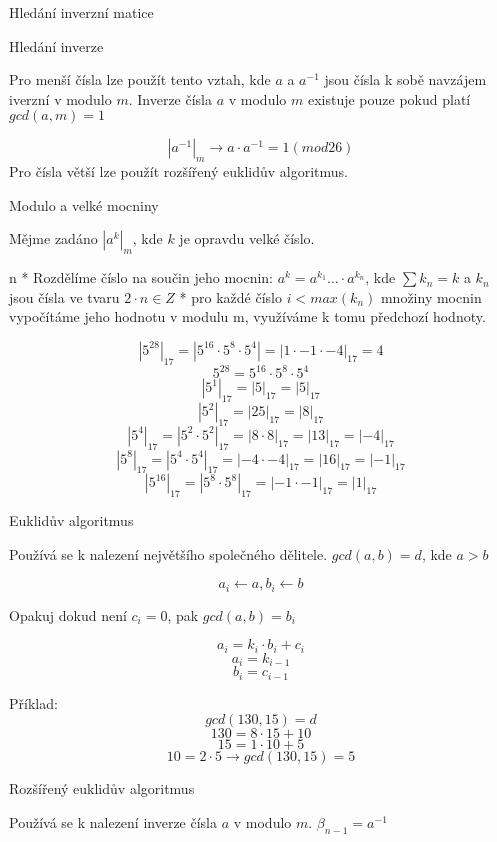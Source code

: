 \sec Hledání inverzní matice

\sec Hledání inverze

Pro menší čísla lze použít tento vztah, kde $a$ a $a^{-1}$ jsou čísla k sobě navzájem iverzní v modulo $m$.
Inverze čísla $a$ v modulo $m$ existuje pouze pokud platí $gcd(a,m) = 1$

$$
|a^{-1}|_{m} \rightarrow a \cdot a^{-1} = 1 (mod 26)
$$
\noindent
Pro čísla větší lze použít rozšířený euklidův algoritmus.

\sec Modulo a velké mocniny

Mějme zadáno $\left|a^k\right|_m$, kde $k$ je opravdu velké číslo.

\begitems \style n
* Rozdělíme číslo na součin jeho mocnin: $a^k=a^{k_1} \ldots \cdot a^{k_n}$, kde $\sum k_n = k$ a $k_n$ jsou čísla ve tvaru $2 \cdot n \in Z$
* pro každé číslo $i < max(k_n)$ množiny mocnin vypočítáme jeho hodnotu v modulu m, využíváme k tomu předchozí hodnoty.
\enditems

$$\left|5^{28}\right|_{17} = \left|5^{16} \cdot 5^8 \cdot 5^4\right| = \left|1 \cdot -1 \cdot -4\right|_{17} = 4$$
$$5^{28} = 5^{16} \cdot 5^8 \cdot 5^4$$
$$\left|5^1\right|_{17} = \left|5 \right|_{17} = \left|5\right|_{17}$$
$$\left|5^2\right|_{17} = \left|25 \right|_{17} = \left|8\right|_{17}$$
$$\left|5^4\right|_{17} = \left|5^2 \cdot 5^2\right|_{17} = \left|8 \cdot 8\right|_{17} = \left|13\right|_{17} = \left|-4\right|_{17}$$
$$\left|5^8\right|_{17} = \left|5^4 \cdot 5^4\right|_{17} = \left|-4 \cdot -4\right|_{17} = \left|16\right|_{17} = \left|-1\right|_{17}$$
$$\left|5^{16}\right|_{17} = \left|5^8 \cdot 5^8\right|_{17} = \left|-1 \cdot -1\right|_{17} = \left|1\right|_{17}$$

\sec Euklidův algoritmus

Používá se k nalezení největšího společného dělitele. $gcd(a,b) = d$, kde $a > b$

$$a_i \leftarrow a, b_i \leftarrow b$$
\centerline{Opakuj dokud není $c_i = 0$, pak $gcd(a,b) = b_i$}
$$a_i = k_i \cdot b_i + c_i$$
$$a_i = k_{i-1}$$
$$b_i = c_{i-1}$$

\noindent
Příklad:
$$gcd(130,15) = d$$
$$130 = 8 \cdot 15 + 10$$
$$15 = 1 \cdot 10 + 5$$
$$10 = 2 \cdot 5 \rightarrow gcd(130,15) = 5$$

\sec Rozšířený euklidův algoritmus

Používá se k nalezení inverze čísla $a$ v modulo $m$. $\beta_{n-1} = a^{-1}$



